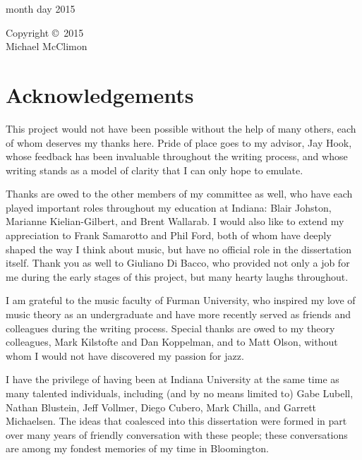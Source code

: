 {\flushleft
month day 2015
}

\cleardoublepage

\begin{center}
  \vspace*{\fill}
  Copyright \copyright\ 2015 \\
  Michael McClimon
  \vspace*{\fill}
\end{center}
\cleardoublepage


\section*{\Large Acknowledgements}

\doublespacing

This project would not have been possible without the help of many others,
each of whom deserves my thanks here. Pride of place goes to my advisor, Jay
Hook, whose feedback has been invaluable throughout the writing process, and
whose writing stands as a model of clarity that I can only hope to emulate.

Thanks are owed to the other members of my committee as well, who have each
played important roles throughout my education at Indiana: Blair Johston,
Marianne Kielian-Gilbert, and Brent Wallarab. I would also like to extend my
appreciation to Frank Samarotto and Phil Ford, both of whom have deeply shaped
the way I think about music, but have no official role in the dissertation
itself. Thank you as well to Giuliano Di Bacco, who provided not only a job
for me during the early stages of this project, but many hearty laughs throughout.

I am grateful to the music faculty of Furman University, who inspired my love
of music theory as an undergraduate and have more recently served as friends
and colleagues during the writing process. Special thanks are owed to my
theory colleagues, Mark Kilstofte and Dan Koppelman, and to Matt Olson,
without whom I would not have discovered my passion for jazz.

I have the privilege of having been at Indiana University at the same time as
many talented individuals, including (and by no means limited to) Gabe Lubell,
Nathan Blustein, Jeff Vollmer, Diego Cubero, Mark Chilla, and Garrett
Michaelsen. The ideas that coalesced into this dissertation were formed in
part over many years of friendly conversation with these people; these
conversations are among my fondest memories of my time in Bloomington.

